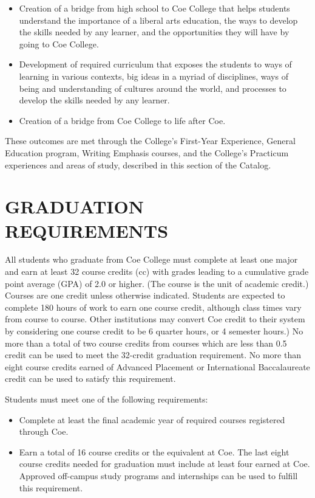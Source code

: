 \documentclass[
  letterpaper,
]{scrbook}
\providecommand{\tightlist}{%
  \setlength{\itemsep}{0pt}\setlength{\parskip}{0pt}}
\begin{document}
\begin{itemize}
\tightlist
\item
  Creation of a bridge from high school to Coe College that helps
  students understand the importance of a liberal arts education, the
  ways to develop the skills needed by any learner, and the
  opportunities they will have by going to Coe College.
\item
  Development of required curriculum that exposes the students to ways
  of learning in various contexts, big ideas in a myriad of disciplines,
  ways of being and understanding of cultures around the world, and
  processes to develop the skills needed by any learner.
\item
  Creation of a bridge from Coe College to life after Coe.
\end{itemize}

These outcomes are met through the College's First-Year Experience,
General Education program, Writing Emphasis courses, and the College's
Practicum experiences and areas of study, described in this section of
the Catalog.

\hypertarget{graduation-requirements}{%
\section*{GRADUATION REQUIREMENTS}\label{graduation-requirements}}


All students who graduate from Coe College must complete at least one
major and earn at least 32 course credits (cc) with grades leading to a
cumulative grade point average (GPA) of 2.0 or higher. (The course is
the unit of academic credit.) Courses are one credit unless otherwise
indicated. Students are expected to complete 180 hours of work to earn
one course credit, although class times vary from course to course.
Other institutions may convert Coe credit to their system by considering
one course credit to be 6 quarter hours, or 4 semester hours.) No more
than a total of two course credits from courses which are less than 0.5
credit can be used to meet the 32-credit graduation requirement. No more
than eight course credits earned of Advanced Placement or International
Baccalaureate credit can be used to satisfy this requirement.

Students must meet one of the following requirements:

\begin{itemize}
\tightlist
\item
  Complete at least the final academic year of required courses
  registered through Coe.
\item
  Earn a total of 16 course credits or the equivalent at Coe. The last
  eight course credits needed for graduation must include at least four
  earned at Coe. Approved off-campus study programs and internships can
  be used to fulfill this requirement.
\end{itemize}
\end{document}
